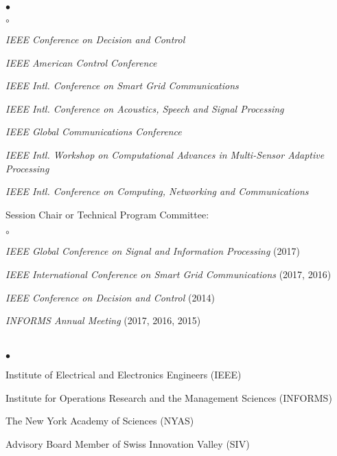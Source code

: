 \documentclass[margin,line]{res}
\newenvironment{list2}{
  \begin{list}{$\bullet$}{%
      \setlength{\itemsep}{0in}
      \setlength{\parsep}{0in} \setlength{\parskip}{0in}
      \setlength{\topsep}{0in} \setlength{\partopsep}{0in}
      \setlength{\leftmargin}{0.10in}}}{\end{list}}
\newenvironment{list3}{
  \begin{list}{$\circ$}{%
      \setlength{\itemsep}{0in}
      \setlength{\parsep}{0in} \setlength{\parskip}{0in}
      \setlength{\topsep}{0in} \setlength{\partopsep}{0in}
      \setlength{\leftmargin}{0.28in}}}{\end{list}}
\begin{document}
\begin{resume}
\begin{list2}
\begin{list3}
\item \emph{IEEE Conference on Decision and Control}
\item \emph{IEEE American Control Conference}
\item \emph{IEEE Intl. Conference on Smart Grid Communications}
\item \emph{IEEE Intl.  Conference on Acoustics, Speech and Signal Processing}
\item \emph{IEEE Global Communications Conference}
\item \emph{IEEE Intl.  Workshop on Computational Advances in Multi-Sensor Adaptive Processing}
\item \emph{IEEE Intl.  Conference on Computing, Networking and Communications} 
\end{list3}
\vspace{4mm}
\item Session Chair or Technical Program Committee:
\begin{list3}
\item \emph{IEEE Global Conference on Signal and Information Processing} (2017)
\item \emph{IEEE International Conference on Smart Grid Communications} (2017, 2016)
\item \emph{IEEE Conference on Decision and Control}  (2014)
\item \emph{INFORMS Annual Meeting} (2017, 2016, 2015)
\end{list3}

\end{list2}
%


\vspace{0.4cm}

\section{}

\begin{list2}
\item Institute of Electrical and Electronics Engineers (IEEE)
\item Institute for Operations Research and the Management Sciences (INFORMS)
\item The New York Academy of Sciences (NYAS)
\item Advisory Board Member of Swiss Innovation Valley (SIV)
\end{list2}

\vspace{0.4cm}





\end{resume}
\end{document}
